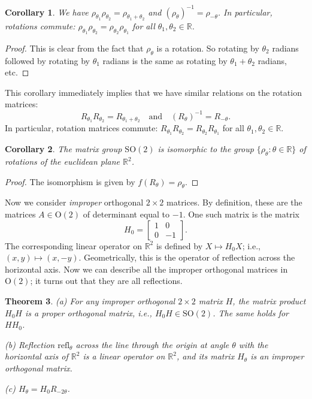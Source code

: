 \documentclass[11pt]{article}
\newtheorem{thm}{Theorem}[section]
\newtheorem{cor}[thm]{Corollary}
\theoremstyle{definition}
\newcommand{\R}{\mathbb{R}} %
\newcommand{\Orth}{\mathrm{O}}
\newcommand{\SO}{\mathrm{SO}}
\begin{document}
\begin{cor}\label{cor:rot-identities}
  We have $\rho_{\theta_1} \rho_{\theta_2} = \rho_{\theta_1+\theta_2}$
  and $(\rho_\theta)^{-1} = \rho_{-\theta}$. In particular, rotations
  commute: $\rho_{\theta_1} \rho_{\theta_2} = \rho_{\theta_2}
  \rho_{\theta_1}$ for all $\theta_1, \theta_2 \in \R$.
\end{cor}

\begin{proof}
This is clear from the fact that $\rho_\theta$ is a rotation. So
rotating by $\theta_2$ radians followed by rotating by $\theta_1$
radians is the same as rotating by $\theta_1+\theta_2$ radians, etc.
\end{proof}

This corollary immediately implies that we have similar relations on
the rotation matrices: 
\[
  R_{\theta_1} R_{\theta_2} = R_{\theta_1+\theta_2}
  \quad\text{and}\quad (R_\theta)^{-1} = R_{-\theta}.
\]
In particular, rotation matrices commute: $R_{\theta_1} R_{\theta_2} =
R_{\theta_2} R_{\theta_1}$ for all $\theta_1, \theta_2 \in \R$.


\begin{cor}
  The matrix group $\SO(2)$ is isomorphic to the group
  $\{ \rho_\theta : \theta \in \R \}$ of rotations of the euclidean
  plane $\R^2$.
\end{cor}

\begin{proof}
The isomorphism is given by $f(R_\theta) = \rho_\theta$. 
\end{proof}

Now we consider \emph{improper} orthogonal $2 \times 2$ matrices. By
definition, these are the matrices $A \in \Orth(2)$ of determinant
equal to $-1$. One such matrix is the matrix
\[
  H_0 = \begin{bmatrix}
    1&0\\0&-1
  \end{bmatrix}.
\]
The corresponding linear operator on $\R^2$ is defined by $X \mapsto
H_0X$; i.e., $(x,y) \mapsto (x,-y)$. Geometrically, this is the
operator of reflection across the horizontal axis. Now we can describe
all the improper orthogonal matrices in $\Orth(2)$; it turns out that
they are all reflections.


\begin{thm}\label{thm:improper-formula}
  (a) For any improper orthogonal $2 \times 2$ matrix $H$, the matrix
  product $H_0 H$ is a proper orthogonal matrix, i.e., $H_0 H \in
  \SO(2)$. The same holds for $HH_0$. 

  (b) Reflection $\text{refl}_\theta$ across the line through the
  origin at angle $\theta$ with the horizontal axis of $\R^2$ is a
  linear operator on $\R^2$, and its matrix $H_\theta$ is an improper
  orthogonal matrix.

  (c) $H_{\theta} = H_0 R_{-2\theta}$. 
\end{thm}
\end{document}
